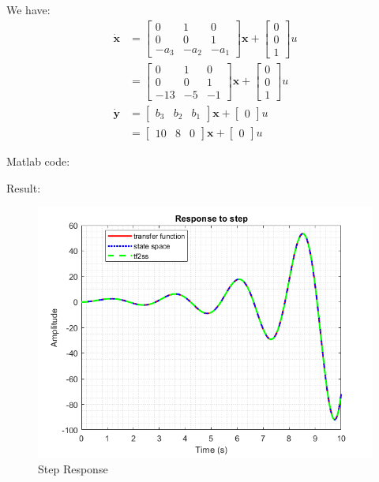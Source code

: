 We have:
\begin{equation}
    \begin{aligned}
        \dot{\textbf{x}} &=
        \begin{bmatrix}
            0    & 1    & 0\\
            0    & 0    & 1\\
            -a_3 & -a_2 & -a_1
        \end{bmatrix}
        \textbf{x} + 
        \begin{bmatrix}
            0 \\ 0 \\ 1
        \end{bmatrix}
        u \\ &=
        \begin{bmatrix}
            0    & 1    & 0\\
            0    & 0    & 1\\
            -13  & -5   & -1
        \end{bmatrix}
        \textbf{x} + 
        \begin{bmatrix}
            0 \\ 0 \\ 1
        \end{bmatrix}
        u \\
        \dot{\textbf{y}} &=
        \begin{bmatrix}
            b_3 & b_2 & b_1
        \end{bmatrix}
        \textbf{x} + 
        \begin{bmatrix}
            0
        \end{bmatrix}
        u \\ &=
        \begin{bmatrix}
            10 & 8 & 0
        \end{bmatrix}
        \textbf{x} + 
        \begin{bmatrix}
            0
        \end{bmatrix}
        u
    \end{aligned}
\end{equation}

Matlab code:
    
Result:
\begin{figure}[htp]
    \centering
    \includegraphics[width=12cm]{images/Q5_b_fig.png}
    \caption{Step Response}
    \label{fig:Q5a1}
\end{figure}
\pagebreak